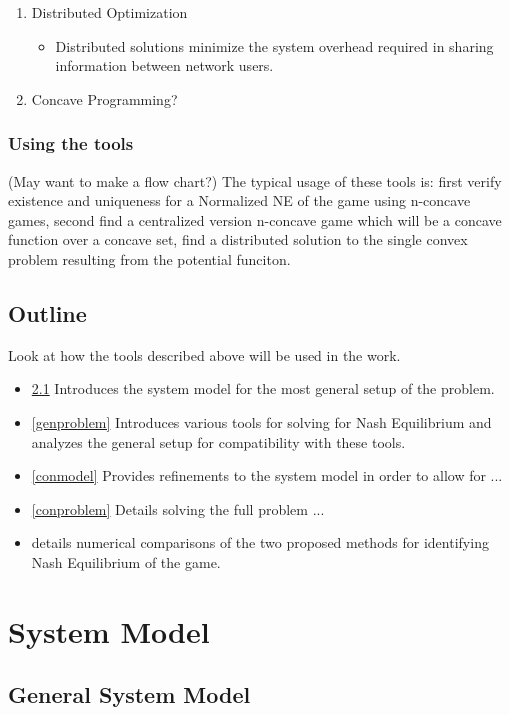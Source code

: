 \documentclass[12pt,a4paper]{report}
\begin{document}
\begin{enumerate}
\item Distributed Optimization
\begin{itemize}
\item Distributed solutions minimize the system overhead required in sharing information between network users. 
\end{itemize}
\item Concave Programming?

\end{enumerate}
\subsection{Using the tools}
(May want to make a flow chart?)
The typical usage of these tools is:
first verify existence and uniqueness for a Normalized NE of the game using n-concave games,
second find a centralized version n-concave game which will be a concave function over a concave set,
find a distributed solution to the single convex problem resulting from the potential funciton.


\section{Outline}
Look at how the tools described above will be used in the work. 
\begin{itemize}
\item 
\ref{genmodel} Introduces the system model for the most general setup of the problem.
\item 
\ref{genproblem} Introduces various tools for solving for Nash Equilibrium and analyzes the general setup for compatibility with these tools. 
\item
\ref{conmodel} Provides refinements to the system model in order to allow for ...
\item 
\ref{conproblem} Details solving the full problem ...
\item 
details numerical comparisons of the two proposed methods for identifying Nash Equilibrium of the game. 
\end{itemize}
\chapter{System Model}

\section{General System Model}\label{genmodel}
\end{document}
